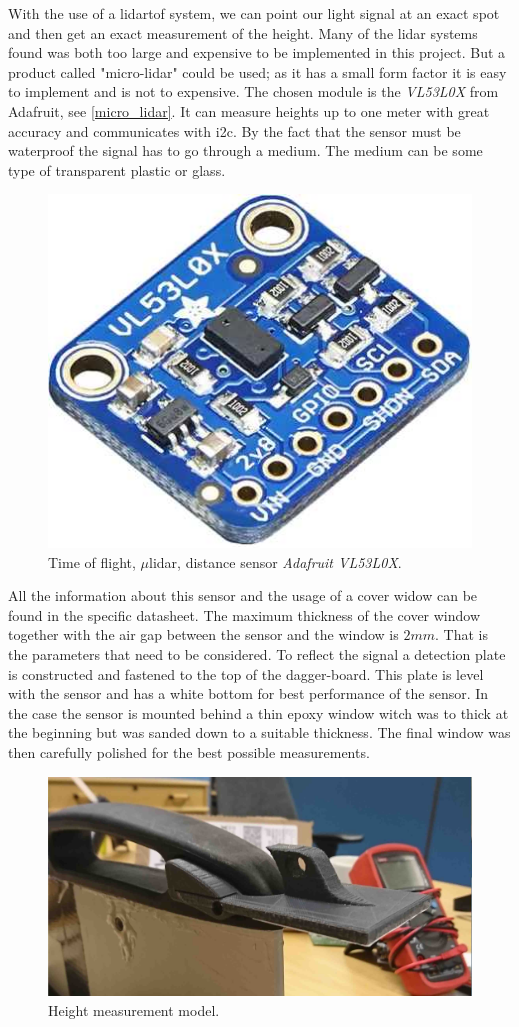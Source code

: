 With the use of a \gls{lidar}\gls{tof} system, we can point our light signal at an exact spot and then get an exact measurement of the height.  
Many of the \gls{lidar} systems found was both too large and expensive to be implemented in this project.
But a product called "micro-lidar" could be used; as it has a small form factor it is easy to implement and is not to expensive.
The chosen module is the \emph{VL53L0X} from Adafruit\cite{micro_lidar}, see \autoref{micro_lidar}. It can measure heights up to one meter with great accuracy and communicates with \gls{i2c}.
By the fact that the sensor must be waterproof the signal has to go through a medium. The medium can be some type of transparent plastic or glass.
\begin{figure}[H]
	\centering
	\includegraphics[width = .45\textwidth]{Figures/Adafruit_height_sensor.jpg}
	\caption{Time of flight, $\mu$\gls{lidar}, distance sensor \emph{Adafruit VL53L0X}.}
	\label{micro_lidar}
\end{figure}

All the information about this sensor and the usage of a cover widow can be found in the specific datasheet\cite{Tof_cover}. The maximum thickness of the cover window together with the air gap between the sensor and the window is $2mm$. That is the parameters that need to be considered. To reflect the signal a detection plate is constructed and fastened to the top of the dagger-board. This plate is level with the sensor and has a white bottom for best performance of the sensor. In the case the sensor is mounted behind a thin epoxy window witch was to thick at the beginning but was sanded down to a suitable thickness. The final window was then carefully polished for the best possible measurements. 

\begin{figure}[H]
	\centering
	\includegraphics[width = .8\textwidth]{Figures/height_measure.jpg}
	\caption{Height measurement model.}
	\label{height_measure}
\end{figure}


